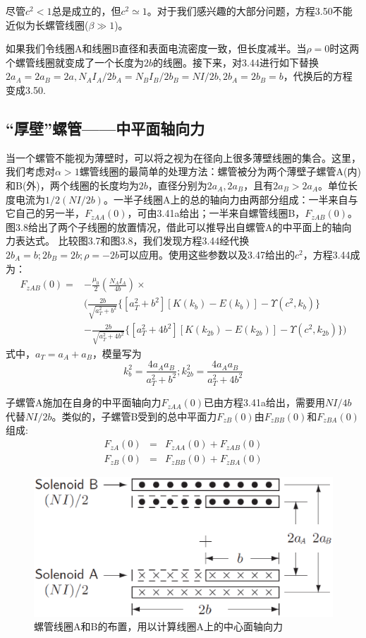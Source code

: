 尽管$c^2<1$总是成立的，但$c^2\simeq 1$。对于我们感兴趣的大部分问题，方程3.50不能近似为长螺管线圈($\beta\gg 1$)。

如果我们令线圈A和线圈B直径和表面电流密度一致，但长度减半。当$\rho=0$时这两个螺管线圈就变成了一个长度为$2b$的线圈。接下来，对3.44进行如下替换$2a_A=2a_B=
2a, N_A I_A/2b_A = N_B I_B/2b_B = NI/2b,2b_A = 2b_B = b$，代换后的方程变成3.50.

\subsection{“厚壁”螺管——中平面轴向力}
当一个螺管不能视为薄壁时，可以将之视为在径向上很多薄壁线圈的集合。这里，我们考虑对$\alpha>1$螺管线圈的最简单的处理方法：螺管被分为两个薄壁子螺管A(内)和B(外)，两个线圈的长度均为$2b$，直径分别为$2a_A,2a_B$，且有$2a_B >2a_A$。单位长度电流为$1/2(NI/2b)$。一半子线圈A上的总的轴向力由两部分组成：一半来自与它自己的另一半，$F_{zAA}(0)$，可由3.41a给出；一半来自螺管线圈B，$F_{zAB}(0)$。图3.8给出了两个子线圈的放置情况，借此可以推导出自螺管A的中平面上的轴向力表达式。
比较图3.7和图3.8，我们发现方程3.44经代换$2b_A = b; 2b_B = 2b; \rho = −2b$可以应用。使用这些参数以及3.47给出的$c^2$，方程3.44成为：
\begin{equation}
\begin{split}
F_{zAB}(0)=&-\frac{\mu_0}{2}(\frac{N_A I_A}{4b})\times \\
&( \frac{2b}{\sqrt{a_T^2+b^2}} \{[a_T^2+b^2][K(k_{b})-E(k_{b})]-\Upsilon(c^2,k_b)\}\\
&-\frac{2b}{\sqrt{a_T^2+4b^2}} \{[a_T^2+4b^2][K(k_{2b})-E(k_{2b})]-\Upsilon(c^2,k_{2b}) \})
\end{split}
\end{equation}
式中，$a_T=a_A+a_B$，模量写为
$$k_{b}^2=\frac{4a_A a_B}{a_T^2+b^2} ; k_{2b}^2=\frac{4a_A a_B}{a_T^2+4b^2} $$

子螺管A施加在自身的中平面轴向力$F_{zAA}(0)$已由方程3.41a给出，需要用$NI/4b$代替$NI/2b$。类似的，子螺管B受到的总中平面力$F_{zB}(0)$由$F_{zBB}(0)$和$F_{zBA}(0)$组成:
\begin{eqnarray}
  F_{zA}(0) &=& F_{zAA}(0)+F_{zAB}(0) \\ \nonumber
  F_{zB}(0) &=& F_{zBB}(0)+F_{zBA}(0)
\end{eqnarray}

\begin{figure}[htbp]
  \centering
 \includegraphics[scale=0.4]{chpt3/figs/fig3.8.eps}
  \caption{螺管线圈A和B的布置，用以计算线圈A上的中心面轴向力}
\end{figure}

